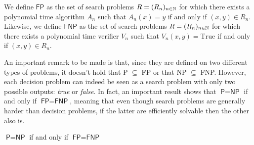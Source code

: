 \begin{definition}
    We define $\mathsf{FP}$ as the set of search problems $R = (R_n)_{n \in \mathbb{N}}$ for which there exists a polynomial time algorithm $A_n$ such that $A_n(x) = y$ if and only if $(x,y) \in R_n$. Likewise, we define $\mathsf{FNP}$ as the set of search problems $R = (R_n)_{n \in \mathbb{N}}$ for which there exists a polynomial time verifier $V_n$ such that $V_n(x,y) = \mathrm{True}$ if and only if $(x,y) \in R_n$. 
\end{definition}

An important remark to be made is that, since they are defined on two different types of problems, it doesn't hold that \textsf{P} $\subseteq$ \textsf{FP} or that \textsf{NP} $\subseteq$ \textsf{FNP}. However, each decision problem can indeed be seen as a search problem with only two possible outputs: \textit{true} or \textit{false}. In fact, an important result shows that $\textsf{P} = \textsf{NP} $ if and only if $\textsf{FP} = \textsf{FNP}$, meaning that even though search problems are generally harder than decision problems, if the latter are efficiently solvable then the other also is.

\begin{theorem}
    $\textsf{P} = \textsf{NP}$ if and only if $\textsf{FP} = \textsf{FNP}$
\end{theorem}

